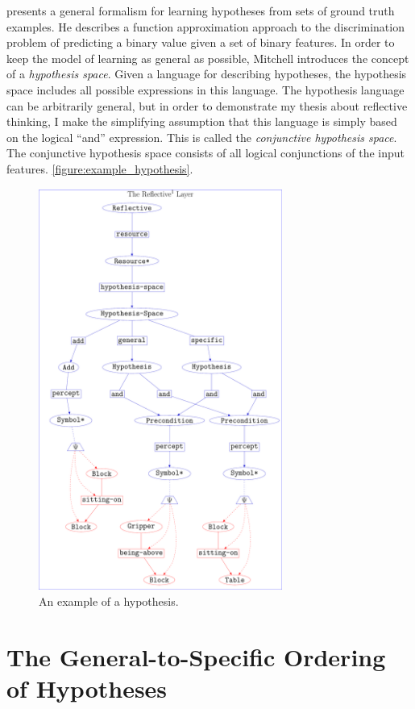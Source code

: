 \cite{mitchell:1997} presents a general formalism for learning
hypotheses from sets of ground truth examples.  He describes a
function approximation approach to the discrimination problem of
predicting a binary value given a set of binary features.  In order to
keep the model of learning as general as possible, Mitchell introduces
the concept of a \emph{hypothesis space}.  Given a language for
describing hypotheses, the hypothesis space includes all possible
expressions in this language.  The hypothesis language can be
arbitrarily general, but in order to demonstrate my thesis about
reflective thinking, I make the simplifying assumption that this
language is simply based on the logical ``and'' expression.  This is
called the \emph{conjunctive hypothesis space}.  The conjunctive
hypothesis space consists of all logical conjunctions of the input
features.
{\mbox{\autoref{figure:example_hypothesis}}}.
\begin{figure}
\center
\includegraphics[width=8cm]{gfx/example_hypothesis}
\caption[An example of a hypothesis.]{An example of a hypothesis.}
\label{figure:example_hypothesis}
\end{figure}

\section{The General-to-Specific Ordering of Hypotheses}

